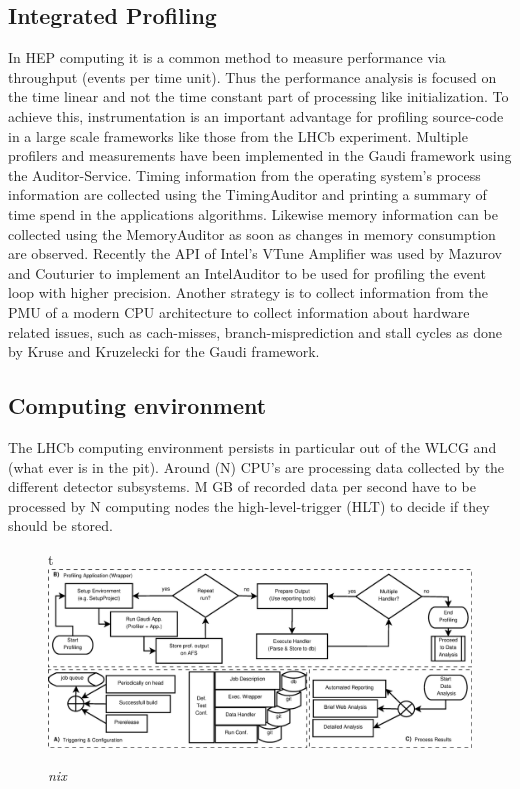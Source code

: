 \documentclass[a4paper]{jpconf}
\begin{document}
\subsection{Integrated Profiling}
\label{sec:integrated_profiling}

In HEP computing it is a common method to measure performance via throughput (events per time unit). Thus the performance analysis is focused on the time linear and not the time constant part of processing like initialization. To achieve this, instrumentation is an important advantage for profiling source-code in a large scale frameworks like those from the LHCb experiment. Multiple profilers and measurements have been implemented in the Gaudi framework using the Auditor-Service. Timing information from the operating system's process information are collected using the TimingAuditor and printing a summary of time spend in the applications algorithms. Likewise memory information can be collected using the MemoryAuditor as soon as changes in memory consumption are observed. Recently the API of Intel's VTune Amplifier was used by Mazurov and Couturier \cite{intel_auditor} to implement an IntelAuditor to be used for profiling the event loop with higher precision. Another strategy is to collect information from the PMU of a modern CPU architecture to collect information about hardware related issues, such as cach-misses, branch-misprediction and stall cycles as done by Kruse and Kruzelecki \cite{monitoring} for the Gaudi framework.

\subsection{Computing environment}
\label{sec:computing_environment}

The LHCb computing environment persists in particular out of the WLCG and (what ever is in the pit). Around (N) CPU's are processing data collected by the different detector subsystems. M GB of recorded data per second have to be processed by N computing nodes the high-level-trigger (HLT) to decide if they should be stored.

\begin{figure}{t}
\includegraphics[scale=0.3]{figures/profiling_process.eps}
\caption{\small \textit{nix}}
\label{fig:trend}
\end{figure}
\end{document}
